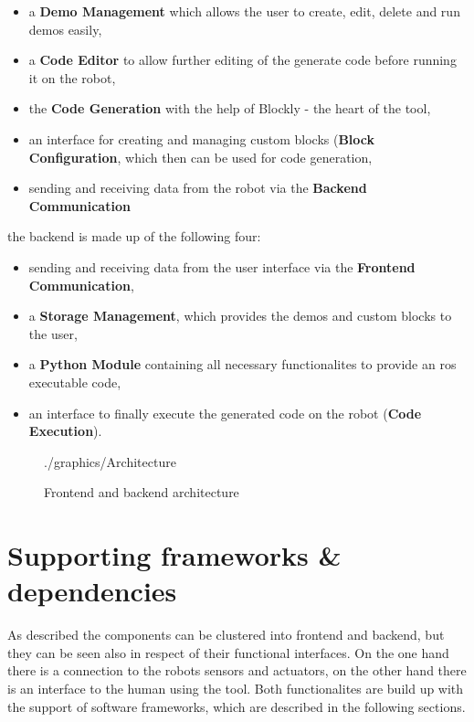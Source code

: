 \begin{itemize}
	\item a \textbf{Demo Management} which allows the user to create, edit, delete and run demos easily,
	\item a \textbf{Code Editor} to allow further editing of the generate code before running it on the robot,
	\item the \textbf{Code Generation} with the help of Blockly - the heart of the tool,
	\item an interface for creating and managing custom blocks (\textbf{Block Configuration}, which then can be used for code generation,
	\item sending and receiving data from the robot via the \textbf{Backend Communication}
\end{itemize}

the backend is made up of the following four:

\begin{itemize}
	\item sending and receiving data from the user interface via the \textbf{Frontend Communication},
	\item a \textbf{Storage Management}, which provides the demos and custom blocks to the user,
	\item a \textbf{Python Module} containing all necessary functionalites to provide an \gls{ros} executable code,
	\item an interface to finally execute the generated code on the robot (\textbf{Code Execution}).
\end{itemize}


\begin{figure}[htbp]
	\centering
	\begin{overpic}[width=\linewidth]{./graphics/Architecture}
	\end{overpic}
	\caption{Frontend and backend architecture}%
	\label{fig:Architecture}%
\end{figure}

\section{Supporting frameworks \& dependencies}
As described the components can be clustered into frontend and backend, but they can be seen also in respect of their functional interfaces. On the one hand there is a connection to the robots sensors and actuators, on the other hand there is an interface to the human using the tool. Both functionalites are build up with the support of software frameworks, which are described in the following sections.

